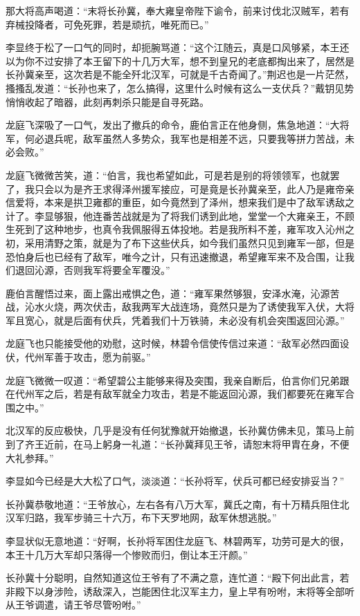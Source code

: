 那大将高声喝道：“末将长孙冀，奉大雍皇帝陛下谕令，前来讨伐北汉贼军，若有弃械投降者，可免死罪，若是顽抗，唯死而已。”

李显终于松了一口气的同时，却扼腕骂道：“这个江随云，真是口风够紧，本王还以为你不过安排了本王留下的十几万大军，想不到皇兄的老底都掏出来了，居然是长孙冀亲至，这次若是不能全歼北汉军，可就是千古奇闻了。”荆迟也是一片茫然，搔搔乱发道：“长孙也来了，怎么搞得，这里什么时候有这么一支伏兵？”戴钥见势悄悄收起了暗器，此刻再刺杀只能是自寻死路。

龙庭飞深吸了一口气，发出了撤兵的命令，鹿伯言正在他身侧，焦急地道：“大将军，何必退兵呢，敌军虽然人多势众，我军也是相差不远，只要我等拼力苦战，未必会败。”

龙庭飞微微苦笑，道：“伯言，我也希望如此，可是若是别的将领领军，也就罢了，我只会以为是齐王求得泽州援军接应，可是竟是长孙冀亲至，此人乃是雍帝亲信爱将，本来是拱卫雍都的重臣，如今竟然到了泽州，想来我们是中了敌军诱敌之计了。李显够狠，他连番苦战就是为了将我们诱到此地，堂堂一个大雍亲王，不顾生死到了这种地步，也真令我佩服得五体投地。若是我所料不差，雍军攻入沁州之初，采用清野之策，就是为了布下这些伏兵，如今我们虽然只见到雍军一部，但是恐怕身后也已经有了敌军，唯今之计，只有迅速撤退，希望雍军来不及合围，让我们退回沁源，否则我军将要全军覆没。”

鹿伯言醒悟过来，面上露出戒惧之色，道：“雍军果然够狠，安泽水淹，沁源苦战，沁水火烧，两次伏击，敌我两军大战连场，竟然只是为了诱使我军入伏，大将军且宽心，就是后面有伏兵，凭着我们十万铁骑，未必没有机会突围返回沁源。”

龙庭飞也只能接受他的劝慰，这时候，林碧令信使传信过来道：“敌军必然四面设伏，代州军善于攻击，愿为前驱。”

龙庭飞微微一叹道：“希望碧公主能够来得及突围，我亲自断后，伯言你们兄弟跟在代州军之后，若是有敌军就全力攻击，若是不能返回沁源，我们都要死在雍军合围之中。”

北汉军的反应极快，几乎是没有任何犹豫就开始撤退，长孙冀仿佛未见，策马上前到了齐王近前，在马上躬身一礼道：“长孙冀拜见王爷，请恕末将甲胄在身，不便大礼参拜。”

李显如今已经是大大松了口气，淡淡道：“长孙将军，伏兵可都已经安排妥当？”

长孙冀恭敬地道：“王爷放心，左右各有八万大军，冀氏之南，有十万精兵阻住北汉军归路，我军步骑三十六万，布下天罗地网，敌军休想逃脱。”

李显状似无意地道：“好啊，长孙将军困住龙庭飞、林碧两军，功劳可是大的很，本王十几万大军却只落得一个惨败而归，倒让本王汗颜。”

长孙冀十分聪明，自然知道这位王爷有了不满之意，连忙道：“殿下何出此言，若非殿下以身涉险，诱敌深入，岂能困住北汉军主力，皇上早有吩咐，末将等全部听从王爷调遣，请王爷尽管吩咐。”

